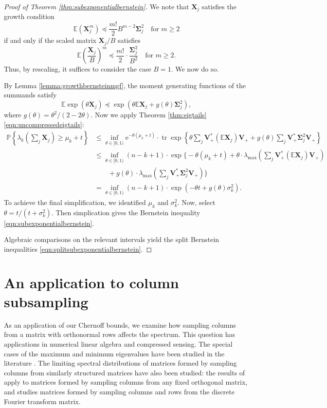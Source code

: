 \documentclass[11pt,letterpaper,twoside,reqno,nosumlimits]{amsart}
\renewcommand{\star}{*}
\newcommand{\mat}[1]{\ensuremath{\bm{#1}}} %
\newcommand{\e}{\ensuremath{\mathrm{e}}}
\newcommand{\E}{\ensuremath{\mathbb{E}}}
\newcommand{\Prob}[1]{\ensuremath{\mathbb{P}\left\{#1\right\}}}
\newcommand{\lambdamax}[1]{\ensuremath{\lambda_{\mathrm{max}}\left(#1\right)}}
\DeclareMathOperator{\tr}{tr}
\newcommand{\trexp}[1]{\ensuremath{\tr\exp\left\{#1\right\}}}
\theoremstyle{remark}
\numberwithin{equation}{section}
\numberwithin{thm}{section}
\numberwithin{prop}{section}
\numberwithin{defn}{section}
\numberwithin{remark}{section}
\begin{document}
\begin{proof}[Proof of Theorem \ref{thm:subexponentialbernstein}]

We note that $\mat{X}_j$ satisfies the growth condition
\[
 \E (\mat{X}_j^m) \preceq \frac{m!}{2} B^{m-2} \mat{\Sigma}_j^2 \quad \text{for } m \geq 2 
\]
if and only if the scaled matrix $\mat{X}_j/B$ satisfies
\[
 \E \left(\frac{\mat{X}_j}{B}\right)^m \preceq \frac{m!}{2} \cdot \frac{\mat{\Sigma}_j^2}{B^2} \quad \text{for } m \geq 2.
\]
Thus, by rescaling, it suffices to consider the case $B = 1.$ We now do so.

By Lemma \ref{lemma:growthbernsteinmgf}, the moment generating functions of the summands satisfy  
\[
 \E \exp(\theta \mat{X}_j) \preceq \exp\left(\theta \E \mat{X}_j + g(\theta) \mat{\Sigma}_j^2 \right),
\]
where $g(\theta) = \theta^2/(2 -2 \theta).$ Now we apply Theorem \ref{thm:eigtails}\eqref{eqn:uncompressedeigtails}:
\begin{align*}
 \Prob{\lambda_k\left(\sum\nolimits_j \mat{X}_j\right) \geq \mu_k + t} & \leq \inf_{\theta \in [0,1)} \e^{-\theta(\mu_k + t)} \cdot \trexp{ \theta \sum\nolimits_j \mat{V}_+^\star (\E\mat{X}_j) \mat{V}_+ + g(\theta) \sum\nolimits_j \mat{V}_+^\star \mat{\Sigma}_j^2 \mat{V}_+ } \\
& \leq \inf_{\theta \in [0,1)} (n -k + 1)\cdot \exp\Big\{-\theta(\mu_k + t) + \theta \cdot \lambdamax{\sum\nolimits_j \mat{V}_+^\star (\E\mat{X}_j) \mat{V}_+}   \\
&  \qquad {} + g(\theta) \cdot \lambdamax{\sum\nolimits_j \mat{V}_+^\star \mat{\Sigma}_j^2 \mat{V}_+} \Big\} \\
 & = \inf_{\theta \in [0, 1)} (n-k+1)\cdot \exp\left( -\theta t + g(\theta) \sigma_k^2 \right).
\end{align*}
To achieve the final simplification, we identified $\mu_k$ and $\sigma_k^2.$
Now, select $\theta = t/(t + \sigma_k^2).$ Then simplication gives the Bernstein inequality \eqref{eqn:subexponentialbernstein}. 

Algebraic comparisons on the relevant intervals yield the split Bernstein inequalities \eqref{eqn:splitsubexponentialbernstein}.
\end{proof}

\section{An application to column subsampling}
\label{sec:colsubsampling}

As an application of our Chernoff bounds, we examine how sampling columns from a matrix with orthonormal rows affects the spectrum. This question has applications in numerical linear algebra and compressed sensing. The special cases of the maximum and minimum eigenvalues have been studied in the literature \cite{Tropp08, RV07}. The limiting spectral distributions of matrices formed by sampling columns from similarly structured matrices have also been studied: the results of \cite{GH09} apply to matrices formed by sampling columns from any fixed orthogonal matrix, and \cite{F10} studies matrices formed by sampling columns and rows from the discrete Fourier transform matrix. 
\end{document}

